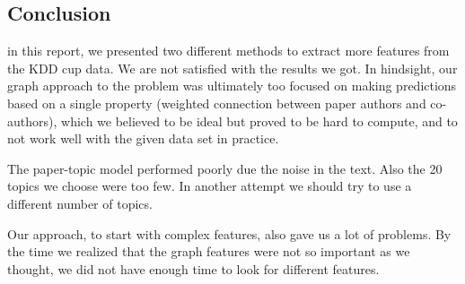 \subsection{Conclusion}

in this report, we presented two different methods to extract more features from the KDD cup data. We are not satisfied with the results we got. In hindsight, our graph approach to the problem was ultimately too focused on making predictions based on a single property (weighted connection between paper authors and co-authors), which we believed to be ideal but proved to be hard to compute, and to not work well with the given data set in practice. 

The paper-topic model performed poorly due the noise in the text. Also the 20 topics we choose were too few. In another attempt we should try to use a different number of topics. 

Our approach, to start with complex features, also gave us a lot of problems. By the time we realized that the graph features were not so important as we thought, we did not have enough time to look for different features.


